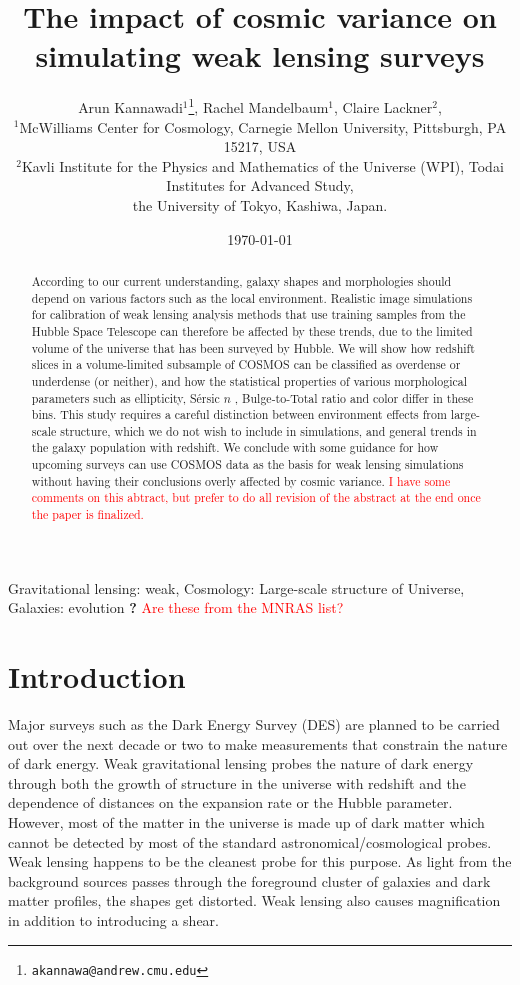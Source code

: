 \documentclass[twocolumn,useAMS,usenatbib]{mn2e}
\title[WL simulation]{The impact of cosmic variance on simulating weak lensing surveys}
\author[Kannawadi et al.]
{Arun Kannawadi$^1$\thanks{\tt akannawa@andrew.cmu.edu}, 
Rachel Mandelbaum$^1$,
Claire Lackner$^2$, 
\\$^1$McWilliams Center for Cosmology, Carnegie Mellon University, Pittsburgh, PA 15217, USA
\\$^2$Kavli Institute for the Physics and Mathematics of the Universe (WPI), Todai Institutes for Advanced Study,\\ the University of Tokyo, Kashiwa, Japan.
}
\date{\today}
\newcommand{\rachel}[1]{{\textcolor{red}{#1}}}
\newcommand{\sersicn}{S\'{e}rsic $n$ }
\newcommand{\btt}{Bulge-to-Total }
\begin{document}

\maketitle

\begin{abstract}
According to our current understanding, galaxy shapes and morphologies should depend on various factors such as the local environment. Realistic image simulations for calibration of weak lensing analysis methods that use training samples from the Hubble Space Telescope can therefore be affected by these trends, due to the limited volume of the universe that has been surveyed by Hubble. We will show how redshift slices in a volume-limited subsample of COSMOS can be classified as overdense or underdense (or neither), and how the statistical properties of various morphological parameters such as ellipticity, \sersicn, \btt ratio and color differ in these bins. This study requires a careful distinction between environment effects from large-scale structure, which we do not wish to include in simulations, and general trends in the galaxy population with redshift. We conclude with some guidance for how upcoming surveys can use COSMOS data as the basis for weak lensing simulations without having their conclusions overly affected by cosmic variance.  
\rachel{I have some comments on this abtract, but prefer to do all
  revision of the abstract at the end once the paper is finalized.}
\end{abstract}

\begin{keywords}
 Gravitational lensing: weak, Cosmology: Large-scale structure of Universe, Galaxies: evolution {\bf ?} \rachel{Are these from the MNRAS list?}
\end{keywords}

\section{Introduction}
\label{S:intro}

Major surveys such as the Dark Energy Survey (DES) are planned to be carried out over the next decade or two to make measurements that constrain the nature of dark energy.
Weak gravitational lensing probes the nature of dark energy through both the growth of structure in the universe with redshift and the dependence of distances on the expansion rate or the Hubble parameter.
However, most of the matter in the universe is made up of dark matter which cannot be detected by most of the standard astronomical/cosmological probes. Weak lensing happens to be the cleanest probe for this purpose.
As light from the background sources passes through the foreground cluster of galaxies and dark matter profiles, the shapes get distorted. Weak lensing also causes magnification in addition to introducing a shear.
\end{document}
